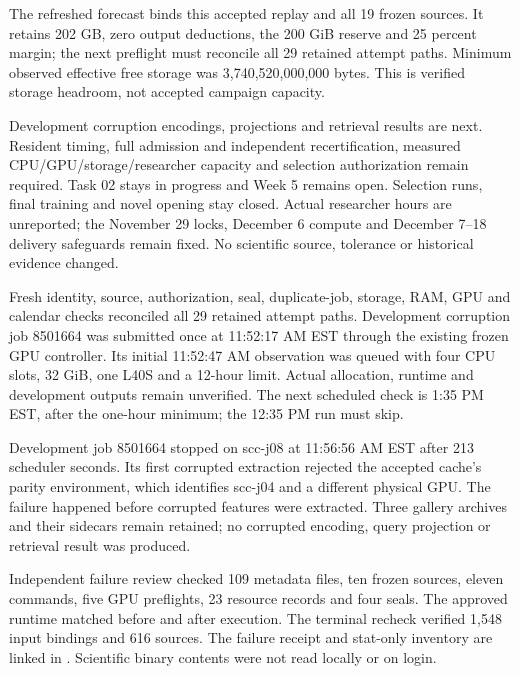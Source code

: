 The refreshed forecast binds this accepted replay and all 19 frozen sources.
It retains 202 GB, zero output deductions, the 200 GiB reserve and 25 percent
margin; the next preflight must reconcile all 29 retained attempt paths.
Minimum observed effective free storage was 3,740,520,000,000 bytes. This is
verified storage headroom, not accepted campaign capacity.

Development corruption encodings, projections and retrieval results are next.
Resident timing, full admission and independent recertification, measured
CPU/GPU/storage/researcher capacity and selection authorization remain required.
Task 02 stays in progress and Week 5 remains open. Selection runs, final
training and novel opening stay closed. Actual researcher hours are unreported;
the November 29 locks, December 6 compute and December 7--18 delivery safeguards
remain fixed. No scientific source, tolerance or historical evidence changed.

Fresh identity, source, authorization, seal, duplicate-job, storage, RAM, GPU
and calendar checks reconciled all 29 retained attempt paths. Development
corruption job 8501664 was submitted once at 11:52:17 AM EST through the existing
frozen GPU controller. Its initial 11:52:47 AM observation was queued with
four CPU slots, 32 GiB, one L40S and a 12-hour limit. Actual allocation,
runtime and development outputs remain unverified. The next scheduled check
is 1:35 PM EST, after the one-hour minimum; the 12:35 PM run must skip.



Development job 8501664 stopped on scc-j08 at 11:56:56 AM EST after 213
scheduler seconds. Its first corrupted extraction rejected the accepted cache's
parity environment, which identifies scc-j04 and a different physical GPU.
The failure happened before corrupted features were extracted. Three gallery
archives and their sidecars remain retained; no corrupted encoding, query
projection or retrieval result was produced.

Independent failure review checked 109 metadata files, ten frozen sources,
eleven commands, five GPU preflights, 23 resource records and four seals.
The approved runtime matched before and after execution. The terminal recheck
verified 1,548 input bindings and 616 sources. The failure receipt and stat-only
inventory are linked in . Scientific
binary contents were not read locally or on login.

